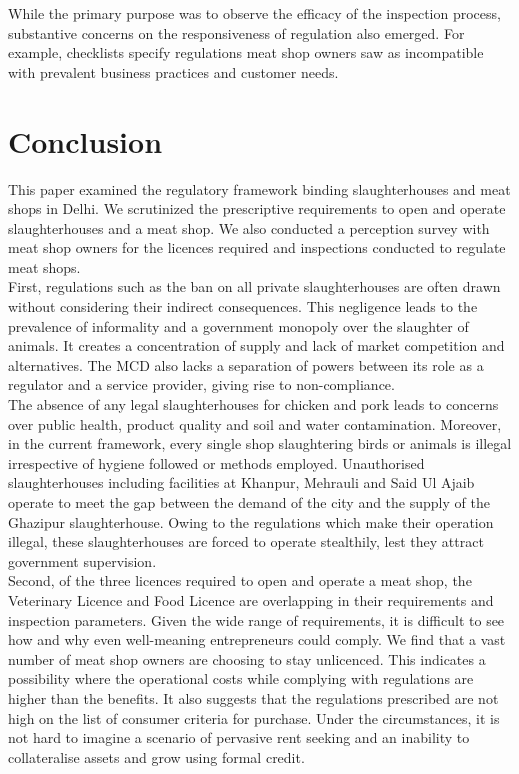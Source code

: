 \documentclass[a4paper, 12pt]{article}
\begin{document}
While the primary purpose was to observe the efficacy of the inspection process, substantive concerns on the responsiveness of regulation also emerged. For example, checklists specify regulations meat shop owners saw as incompatible with prevalent business practices and customer needs. 

\section{Conclusion}

This paper examined the regulatory framework binding slaughterhouses and meat shops in Delhi. We scrutinized the prescriptive requirements to open and operate slaughterhouses and a meat shop. We also conducted a perception survey with meat shop owners for the licences required and inspections conducted to regulate meat shops.\\ 

First, regulations such as the ban on all private slaughterhouses are often drawn without considering their indirect consequences. This negligence leads to the prevalence of informality and a government monopoly over the slaughter of animals. It creates a concentration of supply and lack of market competition and alternatives. The MCD also lacks a separation of powers between its role as a regulator and a service provider, giving rise to non-compliance.\\

The absence of any legal slaughterhouses for chicken and pork leads to concerns over public health, product quality and soil and water contamination. Moreover, in the current framework, every single shop slaughtering birds or animals is illegal irrespective of hygiene followed or methods employed. Unauthorised slaughterhouses including facilities at Khanpur, Mehrauli and Said Ul Ajaib operate to meet the gap between the demand of the city and the supply of the Ghazipur slaughterhouse. Owing to the regulations which make their operation illegal, these slaughterhouses are forced to operate stealthily, lest they attract government supervision. \\

Second, of the three licences required to open and operate a meat shop, the Veterinary Licence and Food Licence are overlapping in their requirements and inspection parameters. Given the wide range of requirements, it is difficult to see how and why even well-meaning entrepreneurs could comply. We find that a vast number of meat shop owners are choosing to stay unlicenced. This indicates a possibility where the operational costs while complying with regulations are higher than the benefits. It also suggests that the regulations prescribed are not high on the list of consumer criteria for purchase. Under the circumstances, it is not hard to imagine a scenario of pervasive rent seeking and an inability to collateralise assets and grow using formal credit. \\
\end{document}
